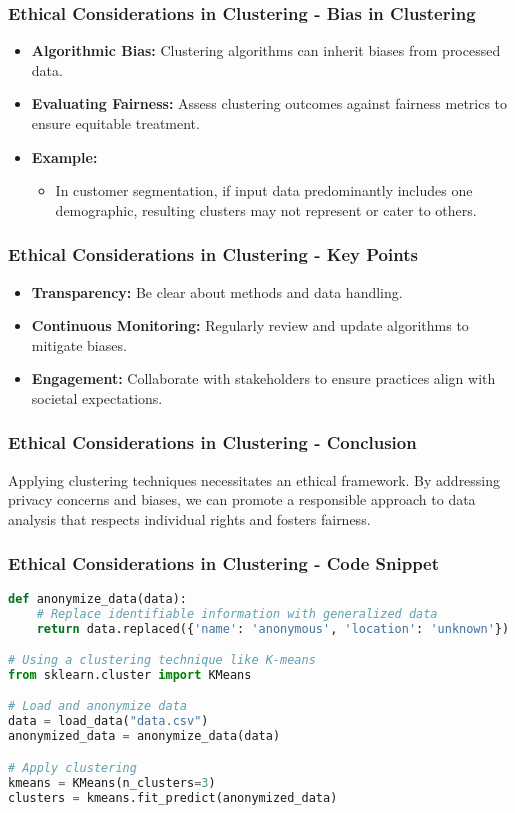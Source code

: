\documentclass{beamer}
\begin{document}
\begin{frame}[fragile]
    \frametitle{Ethical Considerations in Clustering - Bias in Clustering}
    \begin{itemize}
        \item \textbf{Algorithmic Bias:} Clustering algorithms can inherit biases from processed data.
        \item \textbf{Evaluating Fairness:} Assess clustering outcomes against fairness metrics to ensure equitable treatment.
        \item \textbf{Example:} 
            \begin{itemize}
                \item In customer segmentation, if input data predominantly includes one demographic, resulting clusters may not represent or cater to others.
            \end{itemize}
    \end{itemize}    
\end{frame}

\begin{frame}[fragile]
    \frametitle{Ethical Considerations in Clustering - Key Points}
    \begin{itemize}
        \item \textbf{Transparency:} Be clear about methods and data handling.
        \item \textbf{Continuous Monitoring:} Regularly review and update algorithms to mitigate biases.
        \item \textbf{Engagement:} Collaborate with stakeholders to ensure practices align with societal expectations.    
    \end{itemize}    
\end{frame}

\begin{frame}[fragile]
    \frametitle{Ethical Considerations in Clustering - Conclusion}
    Applying clustering techniques necessitates an ethical framework. By addressing privacy concerns and biases, we can promote a responsible approach to data analysis that respects individual rights and fosters fairness.
\end{frame}

\begin{frame}[fragile]
    \frametitle{Ethical Considerations in Clustering - Code Snippet}
    \begin{lstlisting}[language=Python]
def anonymize_data(data):
    # Replace identifiable information with generalized data
    return data.replaced({'name': 'anonymous', 'location': 'unknown'})

# Using a clustering technique like K-means
from sklearn.cluster import KMeans

# Load and anonymize data
data = load_data("data.csv")
anonymized_data = anonymize_data(data)

# Apply clustering
kmeans = KMeans(n_clusters=3)
clusters = kmeans.fit_predict(anonymized_data)
    \end{lstlisting}
\end{frame}
\end{document}
